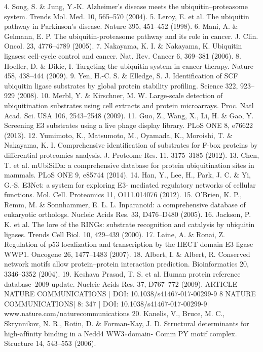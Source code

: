 4. Song, S. \& Jung, Y.-K. Alzheimer’s disease meets the ubiquitin–proteasome
system. Trends Mol. Med. 10, 565–570 (2004).
5. Leroy, E. et al. The ubiquitin pathway in Parkinson’s disease. Nature 395,
451–452 (1998).
6. Mani, A. \& Gelmann, E. P. The ubiquitin-proteasome pathway and its role in
cancer. J. Clin. Oncol. 23, 4776–4789 (2005).
7. Nakayama, K. I. \& Nakayama, K. Ubiquitin ligases: cell-cycle control and
cancer. Nat. Rev. Cancer 6, 369–381 (2006).
8. Hoeller, D. \& Dikic, I. Targeting the ubiquitin system in cancer therapy. Nature
458, 438–444 (2009).
9. Yen, H.-C. S. \& Elledge, S. J. Identiﬁcation of SCF ubiquitin ligase substrates by
global protein stability proﬁling. Science 322, 923–929 (2008).
10. Merbl, Y. \& Kirschner, M. W. Large-scale detection of ubiquitination substrates
using cell extracts and protein microarrays. Proc. Natl Acad. Sci. USA 106,
2543–2548 (2009).
11. Guo, Z., Wang, X., Li, H. \& Gao, Y. Screening E3 substrates using a live phage
display library. PLoS ONE 8, e76622 (2013).
12. Yumimoto, K., Matsumoto, M., Oyamada, K., Moroishi, T. \& Nakayama, K. I.
Comprehensive identiﬁcation of substrates for F-box proteins by differential
proteomics analysis. J. Proteome Res. 11, 3175–3185 (2012).
13. Chen, T. et al. mUbiSiDa: a comprehensive database for protein ubiquitination
sites in mammals. PLoS ONE 9, e85744 (2014).
14. Han, Y., Lee, H., Park, J. C. \& Yi, G.-S. E3Net: a system for exploring E3-
mediated regulatory networks of cellular functions. Mol. Cell. Proteomics 11,
O111.014076 (2012).
15. O’Brien, K. P., Remm, M. \& Sonnhammer, E. L. L. Inparanoid: a
comprehensive database of eukaryotic orthologs. Nucleic Acids Res. 33,
D476–D480 (2005).
16. Jackson, P. K. et al. The lore of the RINGs: substrate recognition and catalysis
by ubiquitin ligases. Trends Cell Biol. 10, 429–439 (2000).
17. Laine, A. \& Ronai, Z. Regulation of p53 localization and transcription
by the HECT domain E3 ligase WWP1. Oncogene 26, 1477–1483
(2007).
18. Albert, I. \& Albert, R. Conserved network motifs allow protein–protein
interaction prediction. Bioinformatics 20, 3346–3352 (2004).
19. Keshava Prasad, T. S. et al. Human protein reference database--2009 update.
Nucleic Acids Res. 37, D767–772 (2009).
ARTICLE
NATURE COMMUNICATIONS | DOI: 10.1038/s41467-017-00299-9
8
NATURE COMMUNICATIONS| 8:  347
| DOI: 10.1038/s41467-017-00299-9| www.nature.com/naturecommunications
20. Kanelis, V., Bruce, M. C., Skrynnikov, N. R., Rotin, D. \& Forman-Kay, J. D.
Structural determinants for high-afﬁnity binding in a Nedd4 WW3∗domain-
Comm PY motif complex. Structure 14, 543–553 (2006).
